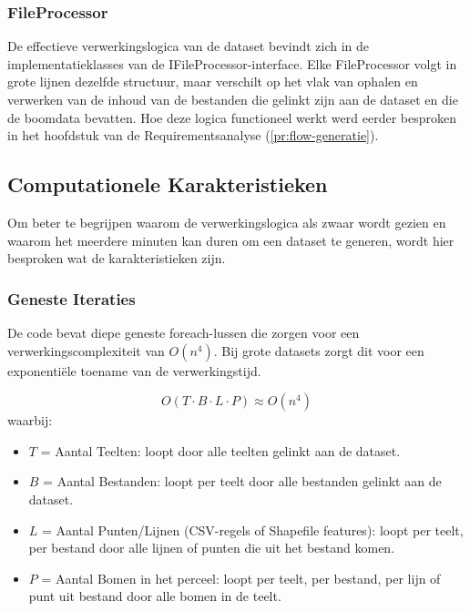 \subsubsection*{FileProcessor}

De effectieve verwerkingslogica van de dataset bevindt zich in de implementatieklasses van de IFileProcessor-interface. Elke FileProcessor volgt in grote lijnen dezelfde structuur, maar verschilt op het vlak van ophalen en verwerken van de inhoud van de bestanden die gelinkt zijn aan de dataset en die de boomdata bevatten. Hoe deze logica functioneel werkt werd eerder besproken in het hoofdstuk van de Requirementsanalyse (\ref{pr:flow-generatie}). 

\subsection{Computationele Karakteristieken}

Om beter te begrijpen waarom de verwerkingslogica als zwaar wordt gezien en waarom het meerdere minuten kan duren om een dataset te generen, wordt hier besproken wat de karakteristieken zijn.

\subsubsection*{Geneste Iteraties}

De code bevat diepe geneste foreach-lussen die zorgen voor een verwerkingscomplexiteit van $O(n^4)$. Bij grote datasets zorgt dit voor een exponentiële toename van de verwerkingstijd.

\begin{equation}
    O(T \cdot B \cdot L \cdot P) \approx O(n^4)
\end{equation}
\label{frm:iteraties}
waarbij:
\begin{itemize}
    \item $T$ = Aantal Teelten: loopt door alle teelten gelinkt aan de dataset.
    \item $B$ = Aantal Bestanden: loopt per teelt door alle bestanden gelinkt aan de dataset.
    \item $L$ = Aantal Punten/Lijnen (CSV-regels of Shapefile features): loopt per teelt, per bestand door alle lijnen of punten die uit het bestand komen.
    \item $P$ = Aantal Bomen in het perceel: loopt per teelt, per bestand, per lijn of punt uit bestand door alle bomen in de teelt.
\end{itemize}

